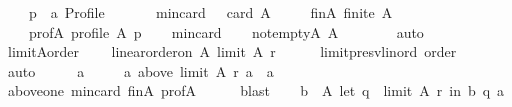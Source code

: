 \begin{isabellebody}
\ \ \ \ p\ {\isacharcolon}{\kern0pt}{\isacharcolon}{\kern0pt}\ {\isachardoublequoteopen}{\isacharprime}{\kern0pt}a\ Profile{\isachardoublequoteclose}\isanewline
\ \ \isamarkupfalse%
\isanewline
\ \ \ \ min{\isacharunderscore}{\kern0pt}{}{\isacharunderscore}{\kern0pt}card{\isacharcolon}{\kern0pt}\ {\isachardoublequoteopen}{}\ {\isasymle}\ card\ A{\isachardoublequoteclose}\ \isanewline
\ \ \ \ finA{\isacharcolon}{\kern0pt}\ {\isachardoublequoteopen}finite\ A{\isachardoublequoteclose}\ \isanewline
\ \ \ \ profA{\isacharcolon}{\kern0pt}\ {\isachardoublequoteopen}profile\ A\ p{\isachardoublequoteclose}\isanewline
\ \ \isamarkupfalse%
\ min{\isacharunderscore}{\kern0pt}{}{\isacharunderscore}{\kern0pt}card\isanewline
\ \ \isamarkupfalse%
\ not{\isacharunderscore}{\kern0pt}empty{\isacharunderscore}{\kern0pt}A{\isacharcolon}{\kern0pt}\ {\isachardoublequoteopen}A\ {\isasymnoteq}\ {\isacharbraceleft}{\kern0pt}{\isacharbraceright}{\kern0pt}{\isachardoublequoteclose}\isanewline
\ \ \ \ \isamarkupfalse%
\ auto\isanewline
\ \ \isamarkupfalse%
\ \isamarkupfalse%
\ limitA{\isacharunderscore}{\kern0pt}order{\isacharcolon}{\kern0pt}\isanewline
\ \ \ \ {\isachardoublequoteopen}linear{\isacharunderscore}{\kern0pt}order{\isacharunderscore}{\kern0pt}on\ A\ {\isacharparenleft}{\kern0pt}limit\ A\ r{\isacharparenright}{\kern0pt}{\isachardoublequoteclose}\isanewline
\ \ \ \ \isamarkupfalse%
\ limit{\isacharunderscore}{\kern0pt}presv{\isacharunderscore}{\kern0pt}lin{\isacharunderscore}{\kern0pt}ord\ order\isanewline
\ \ \ \ \isamarkupfalse%
\ auto\isanewline
\ \ \isamarkupfalse%
\ \isamarkupfalse%
\ a\ \isanewline
\ \ \ \ a{\isacharcolon}{\kern0pt}\ {\isachardoublequoteopen}above\ {\isacharparenleft}{\kern0pt}limit\ A\ r{\isacharparenright}{\kern0pt}\ a\ {\isacharequal}{\kern0pt}\ {\isacharbraceleft}{\kern0pt}a{\isacharbraceright}{\kern0pt}{\isachardoublequoteclose}\isanewline
\ \ \ \ \isamarkupfalse%
\ above{\isacharunderscore}{\kern0pt}one\ min{\isacharunderscore}{\kern0pt}{}{\isacharunderscore}{\kern0pt}card\ finA\ profA\isanewline
\ \ \ \ \isamarkupfalse%
\ blast\isanewline
\ \ \isamarkupfalse%
\ {\isachardoublequoteopen}{\isasymforall}b\ {\isasymin}\ A{\isachardot}{\kern0pt}\ let\ q\ {\isacharequal}{\kern0pt}\ limit\ A\ r\ in\ {\isacharparenleft}{\kern0pt}b\ {\isasympreceq}\isactrlsub q\ a{\isacharparenright}{\kern0pt}{\isachardoublequoteclose}\isanewline

\end{isabellebody}
